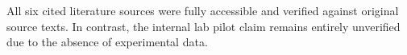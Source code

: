 \documentclass[11pt,a4paper]{article}
\begin{document}
All six cited literature sources \cite{hu2021lora, dettmers2023qlora, liu2024dora, li2023loftq, zhang2023adalora, he2021unified} were fully accessible and verified against original source texts. In contrast, the internal lab pilot claim remains entirely unverified due to the absence of experimental data.



\end{document}
